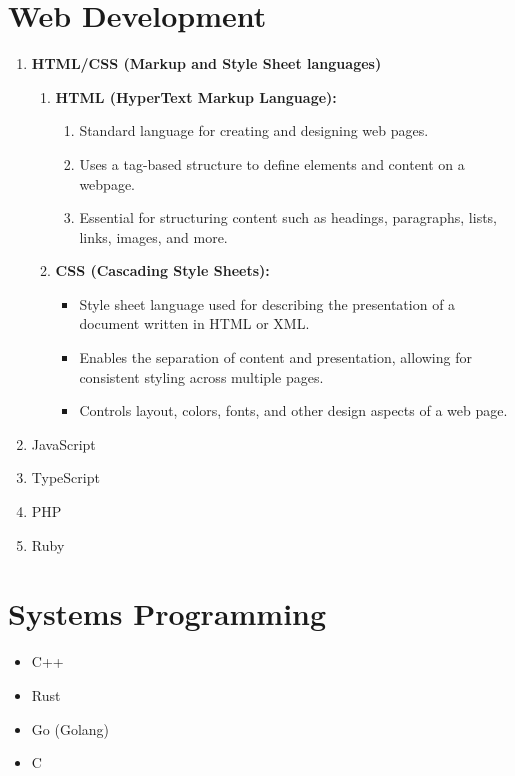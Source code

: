 \documentclass{article}
\begin{document}
\section{Web Development}

\begin{enumerate}
    \item \textbf{HTML/CSS (Markup and Style Sheet languages)}
    \begin{enumerate}
        \item \textbf{HTML (HyperText Markup Language):}
              \begin{enumerate}
                  \item Standard language for creating and designing web pages.
                  \item Uses a tag-based structure to define elements and content on a webpage.
                  \item Essential for structuring content such as headings, paragraphs, lists, links, images, and more.
              \end{enumerate}
        \item \textbf{CSS (Cascading Style Sheets):}
              \begin{itemize}
                  \item Style sheet language used for describing the presentation of a document written in HTML or XML.
                  \item Enables the separation of content and presentation, allowing for consistent styling across multiple pages.
                  \item Controls layout, colors, fonts, and other design aspects of a web page.
              \end{itemize}
    \end{enumerate}
    \item JavaScript
    \item TypeScript
    \item PHP
    \item Ruby
\end{enumerate}

\section{Systems Programming}

\begin{itemize}
    \item C++
    \item Rust
    \item Go (Golang)
    \item C
\end{itemize}
\end{document}
